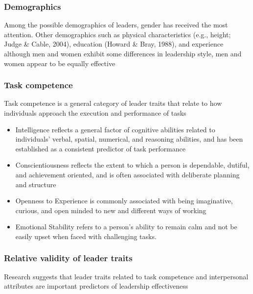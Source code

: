\subsubsection{Demographics} %
\label{ssub:demographics}
Among the possible demographics of leaders, gender has received the most attention. Other demographics such as physical characteristics (e.g., height; Judge \& Cable, 2004), education (Howard \& Bray, 1988), and experience 
although men and women exhibit some differences in leadership style, men and women appear to be equally effective


\subsubsection{Task competence} %
\label{ssub:task_competence}
Task competence is a general category of leader traits that relate to how individuals approach the execution and performance of tasks

\begin{itemize}
	\item Intelligence reflects a general factor of cognitive abilities related to individuals’ verbal, spatial, numerical, and reasoning abilities, and has been established as a consistent predictor of task performance
	\item Conscientiousness reflects the extent to which a person is dependable, dutiful, and achievement oriented, and is often associated with deliberate planning and structure
	\item Openness to Experience is commonly associated with being imaginative, curious, and open minded to new and different ways of working 
	\item Emotional Stability refers to a person’s ability to remain calm and not be easily upset when faced with challenging tasks.
\end{itemize}

\subsubsection{Relative validity of leader traits} %
\label{ssub:relative_validity_of_leader_traits}
Research suggests that leader traits related to task competence and interpersonal attributes are important predictors of leadership effectiveness

